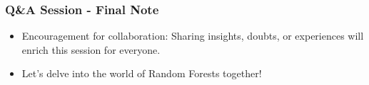 \documentclass[aspectratio=169]{beamer}
\begin{document}
\begin{frame}[fragile]
    \frametitle{Q\&A Session - Final Note}
    \begin{itemize}
        \item Encouragement for collaboration: Sharing insights, doubts, or experiences will enrich this session for everyone.
        \item Let's delve into the world of Random Forests together!
    \end{itemize}
\end{frame}
\end{document}
